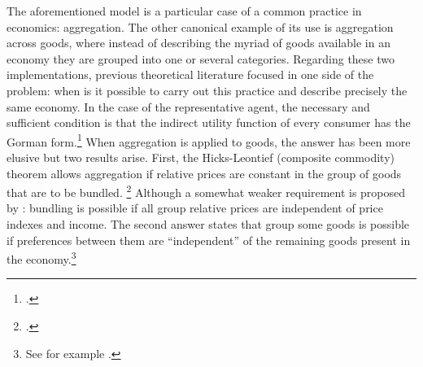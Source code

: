 \documentclass[english, a4paper,12pt]{article}
\begin{document}
The aforementioned model is a particular case of a common practice in economics: aggregation. The other canonical example of its use is aggregation across goods, where instead of describing the myriad of goods available in an economy they are grouped into one or several categories. Regarding these two implementations, previous theoretical literature focused in one side of the problem: when is it possible to carry out this practice and describe precisely the same economy. In the case of the representative agent, the necessary and sufficient condition is that the indirect utility function of every consumer has the Gorman form.\footnote{\cite{Gorman53}.} When aggregation is applied to goods, the answer has been more elusive but two results arise. First, the Hicks-Leontief (composite commodity) theorem allows aggregation if relative prices are constant in the group of goods that are to be bundled. \footnote{\cite{Leontief36, HicksBook}.} Although a somewhat weaker requirement is proposed by \cite{Lewbel96}: bundling is possible if all group relative prices are independent of price indexes and income. The second answer states that group some goods is possible if preferences between them are ``independent'' of the remaining goods present in the economy.\footnote{See for example \cite{GormanSeparability}.}  
 
\end{document}
